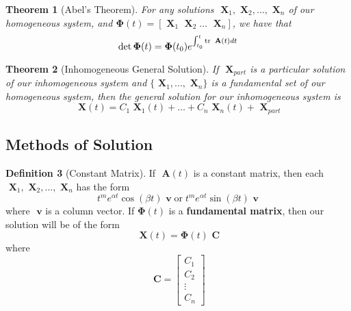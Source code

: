 \documentclass[12pt]{article}
\newtheorem{thm}{Theorem}[section]
\theoremstyle{definition}
\newtheorem{defn}[thm]{Definition}
\theoremstyle{remark}
\numberwithin{equation}{section}
\newcommand\B[1]{\textbf{ #1}}
\begin{document}
\vspace{1cm}

\begin{thm}[Abel's Theorem]
        For any solutions $\B{X}_1,\B{X}_2,...,\B{X}_n$ of our homogeneous system, and $\boldsymbol{\Phi}(t) = \left[\B{X}_1\;\B{X}_2\;...\;\B{X}_n\right]$, we have that \begin{equation}
                \det\boldsymbol{\Phi}(t) = \boldsymbol{\Phi}(t_0)e^{\int_{t_0}^t\tr\B{A}(t)dt}
        \end{equation}
\end{thm}


\vspace{1cm}



\begin{thm}[Inhomogeneous General Solution]
        If $\B{X}_{part}$ is a particular solution of our inhomogeneous system and $\{\B{X}_1,...,\B{X}_n\}$ is a fundamental set of our homogeneous system, then the general solution for our inhomogeneous system is \begin{equation}
                \B{X}(t) = C_1\B{X}_1(t) + \hdots +  C_n\B{X}_n(t) + \B{X}_{part}
        \end{equation}
\end{thm}

\vspace{1cm}

\subsection{Methods of Solution}


\begin{defn}[Constant Matrix]
        If $\B{A}(t)$ is a constant matrix, then each $\B{X}_1,\B{X}_2,...,\B{X}_n$ has the form \begin{equation}
                t^me^{\alpha t}\cos(\beta t)\B{v}\;\text{or}\;t^me^{\alpha t}\sin(\beta t)\B{v}
        \end{equation}
        where $\B{v}$ is a column vector. If $\boldsymbol{\Phi}(t)$ is a \B{fundamental matrix}, then our solution will be of the form \begin{equation}
                \B{X}(t) = \boldsymbol{\Phi}(t)\B{C}
        \end{equation}
        where \begin{equation}
                \B{C} = \begin{bmatrix} C_1 \\ C_2 \\ \vdots \\ C_n \end{bmatrix}
        \end{equation}
\end{defn}
\end{document}
